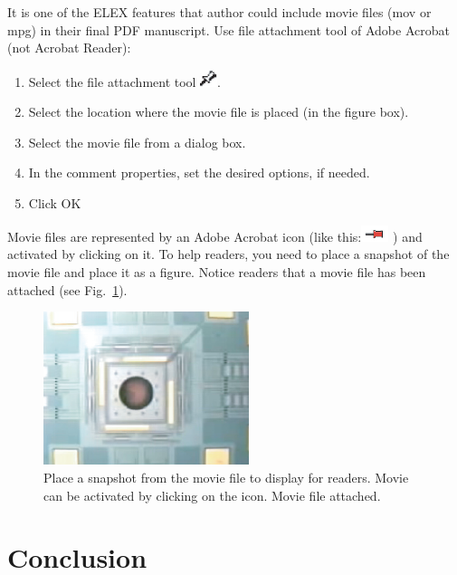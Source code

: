 \documentclass{elex}
\begin{document}
It is one of the ELEX features that author could include movie files (mov or mpg) in their final PDF manuscript.  Use file attachment tool of Adobe Acrobat (not Acrobat Reader):
\begin{enumerate}
\item Select the file attachment tool \includegraphics[width=5mm]{figures/pin.eps}.
\item Select the location where the movie file is placed (in the figure box).
\item Select the movie file from a dialog box.
\item In the comment properties, set the desired options, if needed.
\item Click OK
\end{enumerate}
Movie files are represented by an Adobe Acrobat icon (like this:\includegraphics[width=8mm]{figures/pin2.eps} ) and activated by clicking on it. To help readers, you need to place a snapshot of the movie file and place it as a figure.  Notice readers that a movie file has been attached (see Fig.~\ref{fig:movie}).

\begin{figure}[htb]
\begin{center}
\includegraphics[width=6cm]{figures/snapshot.eps}
\end{center}
\caption{Place a snapshot from the movie file to display for readers.  Movie can be activated by clicking on the icon.  Movie file attached.}
\label{fig:movie}
\end{figure}


\section{Conclusion}
\end{document}
